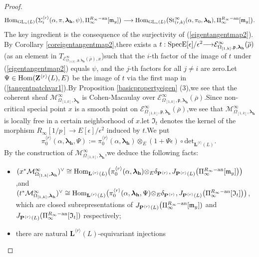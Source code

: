 \documentclass[SecEq,CM,GP]{degruyter-crelle} %
\theoremstyle{plain}
\newcommand{\ana}{{\rm an}}
\newcommand{\bersteineigenvarpik}{{\mathcal{E}_{\omepik,\fp,\bm{\lambda}_\bh}^\infty(\overline{\rho})}}
\newcommand{\GLN}{{\rm GL}}
\newcommand{\homo}{{\rm Hom}}
\newcommand{\lrr}{{\langle r\rangle}}
\newcommand{\lra}{\longrightarrow}
\newcommand{\omepik}{\Omega_{[1,k]}}
\newcommand{\ra}{{\longrightarrow}}
\newcommand{\Spec}{\rm Spec}
\newcommand{\st}{{\rm St}}
\newcommand{\te}{{\otimes_E}}
\newcommand{\bL}{{\mathbf{L}}}
\newcommand{\bP}{{\mathbf{P}}}
\newcommand{\bZ}{{\mathbf{Z}}}
\newcommand{\bh}{{\mathbf{h}}}
\newcommand{\cM}{\mathcal M}
\newcommand{\FI}{{\mathfrak{I}}}
\newcommand{\fm}{{\mathfrak{m}}}
\newcommand{\fp}{{\mathfrak{p}}}
\begin{document}
\begin{proof}
\begin{equation}
	\homo_{\GLN_n(L)}\big(\Sigma_i^{\lrr}(\alpha ,\pi,{\bm\lambda}_\bh, \psi), \Pi_{\infty}^{R_{\infty}-\ana}[\fm_y]\big) \lra \homo_{\GLN_n(L)}\big(\st_{(r,k)}^{\infty}(\alpha,\pi_0,{\bm\lambda}_\bh), \Pi_{\infty}^{R_{\infty}-\ana}[\fm_y]\big).
\end{equation}
The key ingredient is the consequence of the surjectivity of (\ref{eigentangentmap2}).\;
By Corollary \ref{coreigentangentmap2},\;there exists a  $t: \Spec E[\epsilon]/\epsilon^2 \ra \bersteineigenvarpik$ (as an element in $T_{\bersteineigenvarpik,x}$)\;such that the $i$-th factor of the image of $t$ under (\ref{eigentangentmap2}) equals $\psi$, and the $j$-th factors for all $j\neq i$ are zero.\;Let $\Psi\in \homo(\bZ^{\lrr}(L),E)$ be the image of $t$ via the first map in (\ref{tangentpatchvar1}).\;By Proposition \ref{basicpropertyeigen} (3),\;we see that the coherent sheaf $\cM^{\infty}_{\omepik,{\bm\lambda}_\bh}$ is Cohen-Macaulay over $\mathcal{E}_{\omepik,\fp,{\bm\lambda}_\bh}^\infty(\overline{\rho})$.\;Since 
non-critical special point $x$ is a smooth point on $\bersteineigenvarpik$,\;we see that $\cM^{\infty}_{\omepik,{\bm\lambda}_\bh}$ is locally free in a certain neighborhood of $x$.\;let $\FI_t$ denotes the kernel of the morphism $R_{\infty}[1/p] \ra E[\epsilon]/\epsilon^2$ induced by $t$.\;We put \[\pi_0^{\lrr}(\alpha,{\bm\lambda}_\bh,\Psi):=\pi_0^{\lrr}(\alpha,{\bm\lambda}_\bh)\te({1+\Psi \epsilon})\circ\mathrm{det}_{\bL^{\lrr}(L)}.\;\]By the construction of $\cM^{\infty}_{\omepik,{\bm\lambda}_\bh}$,\;we deduce the following facts:
\begin{itemize}
	\item[(a)] $(x^*\cM^{\infty}_{\omepik,{\bm\lambda}_\bh})^{\vee}\cong \homo_{\bL^{\lrr}(L)}\big(\pi_0^{\lrr}(\alpha,{\bm\lambda}_\bh)\te \delta_{\bP^{\lrr}}, {J}_{\bP^{\lrr}(L)}\big(\Pi_{\infty}^{R_{\infty}-\ana}[\fm_y]\big)\big)$,\;and \\
	$(t^* \cM^{\infty}_{\omepik,{\bm\lambda}_\bh})^{\vee}\cong \homo_{\bL^{\lrr}(L)}\big(\pi_0^{\lrr}(\alpha,{\bm\lambda}_\bh,\Psi)\te \delta_{\bP^{\lrr}}, J_{\bP^{\lrr}(L)}\big(\Pi_{\infty}^{R_{\infty}-\ana}[\FI_t]\big)\big)$,\;\\which are closed subrepresentations of $J_{\bP^{\lrr}(L)}\big(\Pi_{\infty}^{R_{\infty}-\ana}[\fm_y])$ and $J_{\bP^{\lrr}(L)}(\Pi_{\infty}^{R_{\infty}-\ana}[\FI_t])$ respectively;
	\item[(b)] there are natural $\bL^{\lrr}(L)$-equivariant injections

\end{itemize}
\end{proof}
\end{document}
